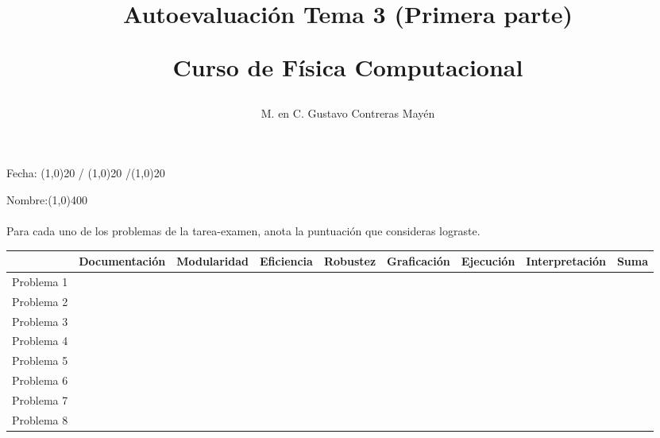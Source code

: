 \documentclass[letterpaper]{article}
\title{Autoevaluación Tema 3 (Primera parte) \\ \begin{large}Curso de Física Computacional\end{large}}
\author{M. en C. Gustavo Contreras Mayén}
\date{ }
\begin{document}
\begin{landscape}
\maketitle
\fontsize{12}{12}\selectfont
{}
\begin{flushright}
Fecha: \line(1,0){20} / \line(1,0){20} /\line(1,0){20}
\end{flushright}
Nombre:\line(1,0){400}
\\
\\
Para cada uno de los problemas de la tarea-examen, anota la puntuación que consideras lograste.
\begin{center}
\renewcommand{\arraystretch}{2.5}
\begin{tabular}{| l | c | c | c | c | c | c | c | c |}
\hline
 & Documentación & Modularidad & Eficiencia & Robustez & Graficación & Ejecución & Interpretación & Suma \\ \hline
Problema 1 & & & & & & & & \\ \hline
Problema 2 & & & & & & & & \\ \hline
Problema 3 & & & & & & & & \\ \hline
Problema 4 & & & & & & & & \\ \hline
Problema 5 & & & & & & & & \\ \hline
Problema 6 & & & & & & & & \\ \hline
Problema 7 & & & & & & & & \\ \hline
Problema 8 & & & & & & & & \\ \hline


\end{tabular}
\end{center}
\end{landscape}
\end{document}

